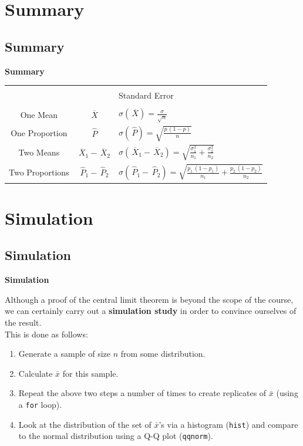 \documentclass[compress]{beamer}        %
\makeatletter
\newcommand{\tcb}{\textcolor{beamer@blendedblue}}
\makeatother
\begin{document}
\section{Summary}
\subsection{Summary}
\begin{frame}{\bf \tcb{Summary}}

\begin{tabular}{|cc|l|}
\hline
&&\\[-0.2cm]
 & & Standard Error \\[0.1cm]
\hline
&&\\[-0.2cm]
One Mean & $\,\overline{\!X}$ & $\sigma(\,\overline{\!X}) = \frac{\sigma}{\sqrt{n}}$\\[0.5cm]
One Proportion & $\,\widehat{\!P}$ & $\sigma(\,\widehat{\!P}) = \sqrt{\frac{p\,(1-p)}{n}}$\\[0.5cm]
Two Means & $\,\overline{\!X}_1- \,\overline{\!X}_2$ & $\sigma(\,\overline{\!X}_1- \,\overline{\!X}_2) = \sqrt{\frac{\sigma_1^2}{n_1}+\frac{\sigma_2^2}{n_2}}$\\[0.5cm]
Two Proportions & $\,\widehat{\!P}_1-\,\widehat{\!P}_2$ & $\sigma(\,\widehat{\!P}_1-\,\widehat{\!P}_2) = \sqrt{\frac{p_1\,(1-p_1)}{n_1} + \frac{p_2\,(1-p_2)}{n_2}}$\\[0.1cm]
\hline
\end{tabular}



\end{frame}





\section{Simulation}
\subsection{Simulation}
\begin{frame}{\bf \tcb{Simulation}}

Although a proof of the central limit theorem is beyond the scope of the course, we can certainly carry out a {\bf simulation study} in order to convince ourselves of the result.\\[0.5cm]


This is done as follows:\\
\begin{enumerate}[1.]\itemsep0.3cm
\item Generate a sample of size $n$ from some distribution.
\item Calculate $\bar x$ for this sample.
\item Repeat the above two steps a number of times to create replicates of $\bar x$ (using a \texttt{for} loop).
\item Look at the distribution of the set of $\bar x$'s via a histogram (\texttt{hist}) and compare to the normal distribution using a Q-Q plot (\texttt{qqnorm}).
\end{enumerate}

\end{frame}
\end{document}
